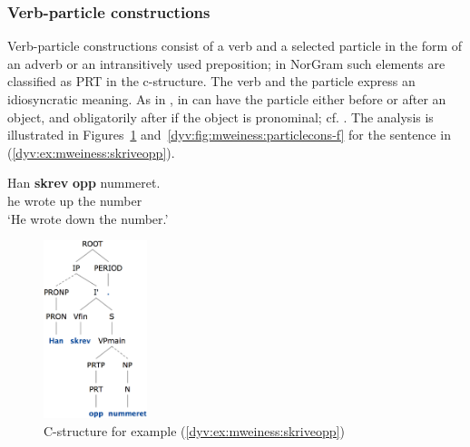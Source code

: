 \documentclass[output=paper]{langsci/langscibook}
\begin{document}
\subsubsection{Verb-particle constructions}\label{dyv:sec:mweiness:prtverbs}

Verb-particle constructions consist of a verb and a selected particle in the form of an adverb or an intransitively used preposition; in NorGram such elements are classified as PRT in the c-structure.
The verb and the particle express an idiosyncratic meaning.
As in ,  in  can have the particle either before or after an object, and obligatorily after if the object is pronominal; cf. \cite[276]{baldwin10}.
The analysis is illustrated in Figures~\ref{dyv:fig:mweiness:particlecons-c} and~\ref{dyv:fig:mweiness:particlecons-f} for the sentence in (\ref{dyv:ex:mweiness:skriveopp}).

\ea\label{dyv:ex:mweiness:skriveopp}
\gll Han \textbf{skrev} \textbf{opp} nummeret. \\
     he wrote up {the number}\\
\glt `He wrote down the number.'
\z


\begin{figure}
  \includegraphics[width=0.27\textwidth]{figures/particlecons-c.png}
  \caption{C-structure for example (\ref{dyv:ex:mweiness:skriveopp})}
  \label{dyv:fig:mweiness:particlecons-c}
\end{figure}
\end{document}
